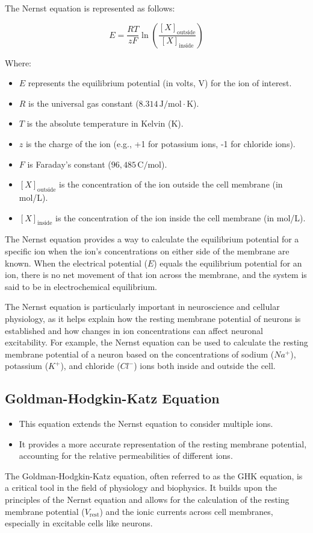 \documentclass{article}
\begin{document}
The Nernst equation is represented as follows:

\[
E = \frac{RT}{zF} \ln\left(\frac{[X]_{\text{outside}}}{[X]_{\text{inside}}}\right)
\]

Where:
\begin{itemize}
  \item \(E\) represents the equilibrium potential (in volts, V) for the ion of interest.
  \item \(R\) is the universal gas constant (\(8.314 \, \text{J/mol} \cdot \text{K}\)).
  \item \(T\) is the absolute temperature in Kelvin (K).
  \item \(z\) is the charge of the ion (e.g., +1 for potassium ions, -1 for chloride ions).
  \item \(F\) is Faraday's constant (\(96,485 \, \text{C/mol}\)).
  \item \([X]_{\text{outside}}\) is the concentration of the ion outside the cell membrane (in mol/L).
  \item \([X]_{\text{inside}}\) is the concentration of the ion inside the cell membrane (in mol/L).
\end{itemize}

The Nernst equation provides a way to calculate the equilibrium potential for a specific ion when the ion's concentrations on either side of the membrane are known. When the electrical potential (\(E\)) equals the equilibrium potential for an ion, there is no net movement of that ion across the membrane, and the system is said to be in electrochemical equilibrium.

The Nernst equation is particularly important in neuroscience and cellular physiology, as it helps explain how the resting membrane potential of neurons is established and how changes in ion concentrations can affect neuronal excitability. For example, the Nernst equation can be used to calculate the resting membrane potential of a neuron based on the concentrations of sodium (\(Na^+\)), potassium (\(K^+\)), and chloride (\(Cl^-\)) ions both inside and outside the cell.


\subsection{Goldman-Hodgkin-Katz Equation}
\begin{itemize}
    \item This equation extends the Nernst equation to consider multiple ions. 
    \item It provides a more accurate representation of the resting membrane potential, accounting for the relative permeabilities of different ions.
\end{itemize}
The Goldman-Hodgkin-Katz equation, often referred to as the GHK equation, is a critical tool in the field of physiology and biophysics. It builds upon the principles of the Nernst equation and allows for the calculation of the resting membrane potential (\(V_{\text{rest}}\)) and the ionic currents across cell membranes, especially in excitable cells like neurons.
\end{document}
